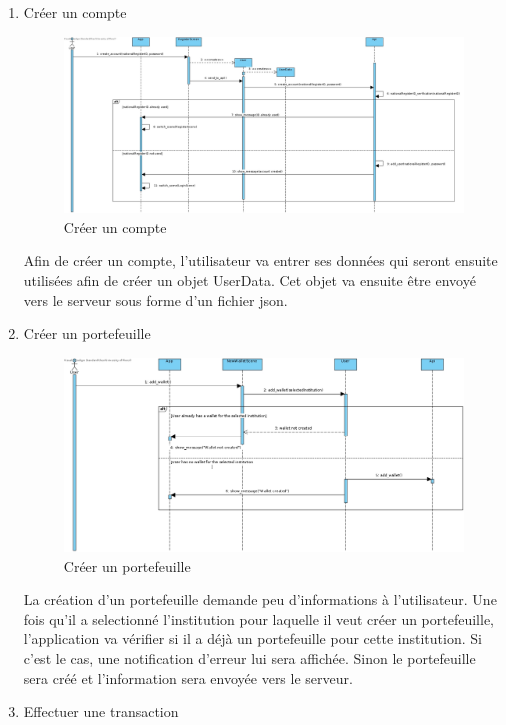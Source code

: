 \documentclass[../rapport.tex]{subfiles}
\begin{document}
\begin{enumerate}
\newpage	
		\item{Créer un compte}\\
			\begin{figure}[h]
				\centering\includegraphics[scale=0.25]{ressources/photos_diagrammes/app1/sequences/creerCompte.jpg}
				\caption{Créer un compte}
			\end{figure}	
Afin de créer un compte, l'utilisateur va entrer ses données qui seront ensuite utilisées afin de créer un objet UserData. Cet objet va ensuite être envoyé vers le serveur sous forme d'un fichier json.
\newpage	
		\item{Créer un portefeuille}\\
			\begin{figure}[h]
				\centering\includegraphics[scale=0.25]{ressources/photos_diagrammes/app1/sequences/creerPortefeuille.jpg}
				\caption{Créer un portefeuille}
			\end{figure}	
La création d'un portefeuille demande peu d'informations à l'utilisateur. Une fois qu'il a selectionné l'institution pour laquelle il veut créer un portefeuille, l'application va vérifier si il a déjà un portefeuille pour cette institution. Si c'est le cas, une notification d'erreur lui sera affichée. Sinon le portefeuille sera créé et l'information sera envoyée vers le serveur.
\newpage	
		\item{Effectuer une transaction}\\

\end{enumerate}
\end{document}
